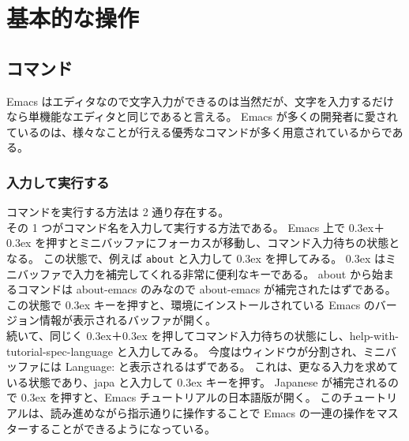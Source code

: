 \chapter{基本的な操作}
\section{コマンド}
Emacs はエディタなので文字入力ができるのは当然だが、文字を入力するだけなら単機能なエディタと同じであると言える。
Emacs が多くの開発者に愛されているのは、様々なことが行える優秀なコマンドが多く用意されているからである。
\subsection{入力して実行する}
コマンドを実行する方法は 2 通り存在する。\\

その 1 つがコマンド名を入力して実行する方法である。
Emacs 上で \raise0.3ex\hbox{}＋\raise0.3ex\hbox{} を押すとミニバッファにフォーカスが移動し、コマンド入力待ちの状態となる。
この状態で、例えば \texttt{about} と入力して \raise0.3ex\hbox{} を押してみる。
\raise0.3ex\hbox{} はミニバッファで入力を補完してくれる非常に便利なキーである。
about から始まるコマンドは about-emacs のみなので about-emacs が補完されたはずである。
この状態で \raise0.3ex\hbox{} キーを押すと、環境にインストールされている Emacs のバージョン情報が表示されるバッファが開く。\\

続いて、同じく \raise0.3ex\hbox{}＋\raise0.3ex\hbox{} を押してコマンド入力待ちの状態にし、help-with-tutorial-spec-language と入力してみる。
今度はウィンドウが分割され、ミニバッファには Language: と表示されるはずである。
これは、更なる入力を求めている状態であり、japa と入力して \raise0.3ex\hbox{} キーを押す。
Japanese が補完されるので \raise0.3ex\hbox{} を押すと、Emacs チュートリアルの日本語版が開く。
このチュートリアルは、読み進めながら指示通りに操作することで Emacs の一連の操作をマスターすることができるようになっている。
